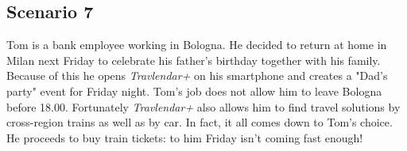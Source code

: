 \subsection*{Scenario 7}

Tom is a bank employee working in Bologna. He decided to return at home in Milan next Friday to celebrate his father's birthday together with his family.
Because of this he opens \textit{Travlendar+} on his smartphone and creates a "Dad's party" event for Friday night.
Tom’s job does not allow him to leave Bologna before 18.00. Fortunately \textit{Travlendar+} also allows him to find travel solutions by cross-region trains as well as by car.
In fact, it all comes down to Tom's choice. He proceeds to buy train tickets: to him Friday isn’t coming fast enough!




